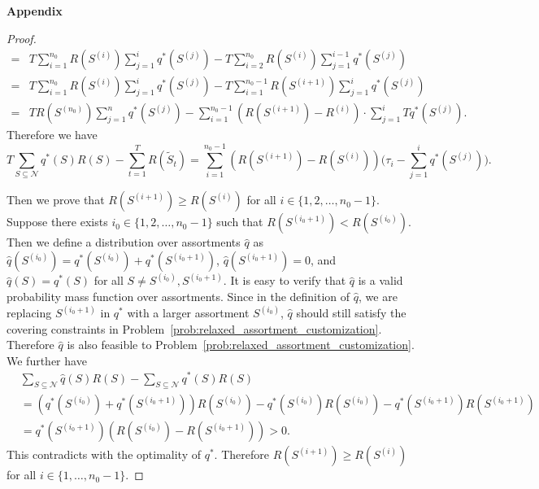 \documentclass[msom,non-blindrev]{informs3} %
\theoremstyle{definition}
\begin{document}
\begin{appendices}{\Large \noindent\textbf{Appendix}}
{\begin{proof}
\begin{align*}
=&T\sum_{i=1}^{n_0} R(S^{(i)})\sum_{j=1}^i q^*(S^{(j)})-T\sum_{i=2}^{n_0} R(S^{(i)})\sum_{j=1}^{i-1}q^*(S^{(j)})\\
=&T\sum_{i=1}^{n_0} R(S^{(i)})\sum_{j=1}^i q^*(S^{(j)})-T\sum_{i=1}^{n_0-1} R(S^{(i+1)})\sum_{j=1}^{i}q^*(S^{(j)})\\
=&TR(S^{(n_0)})\sum_{j=1}^{n}q^*(S^{(j)})-\sum_{i=1}^{n_0-1}(R(S^{(i+1)})-R^{(i)})\cdot \sum_{j=1}^i Tq^*(S^{(j)}).
\end{align*}
Therefore we have
\begin{equation}\label{eq:optimality_gap_bound}
T\sum_{S\subseteq\mathcal{N}}q^*(S)R(S)-\sum_{t=1}^T R(\tilde{S}_t)=\sum_{i=1}^{n_0-1}(R(S^{(i+1)})-R(S^{(i)}))\Big(\tau_{i}-\sum_{j=1}^i q^*(S^{(j)})\Big).
\end{equation}

Then we prove that $R(S^{(i+1)})\geq R(S^{(i)})$ for all $i\in\{1,2,\dots,n_0-1\}$. Suppose there exists \mbox{$i_0\in\{1,2,\dots,n_0-1\}$} such that $R(S^{(i_0+1)})<R(S^{(i_0)})$. Then we define a distribution over assortments $\hat{q}$ as $\hat{q}(S^{(i_0)})=q^*(S^{(i_0)})+q^*(S^{(i_0+1)})$, $\hat{q}(S^{(i_0+1)})=0$, and $\hat{q}(S)=q^*(S)$ for all $S\neq S^{(i_0)}, S^{(i_0+1)}$. It is easy to verify that $\hat{q}$ is a valid probability mass function over assortments. Since in the definition of $\hat{q}$, we are replacing $S^{(i_0+1)}$ in $q^*$ with a larger assortment $S^{(i_0)}$, $\hat{q}$ should still satisfy the covering constraints in Problem~\eqref{prob:relaxed_assortment_customization}. Therefore $\hat{q}$ is also feasible to Problem~\eqref{prob:relaxed_assortment_customization}. We further have
\begin{equation*}
\begin{split}
&\sum_{S\subseteq\mathcal{N}}\hat{q}(S)R(S)-\sum_{S\subseteq\mathcal{N}}q^*(S)R(S)\\
&=(q^*(S^{(i_0)})+q^*(S^{(i_0+1)}))R(S^{(i_0)})-q^*(S^{(i_0)})R(S^{(i_0)})-q^*(S^{(i_0+1)})R(S^{(i_0+1)})\\
&=q^*(S^{(i_0+1)})(R(S^{(i_0)})-R(S^{(i_0+1)}))>0.
\end{split}
\end{equation*}
This contradicts with the optimality of $q^*$. Therefore $R(S^{(i+1)})\geq R(S^{(i)})$ for all \mbox{$i\in\{1,\dots,n_0-1\}$.}


\end{proof}}
\end{appendices}
\end{document}
